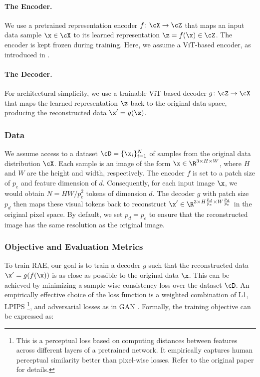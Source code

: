 \documentclass[../../book-main.tex]{subfiles}
\begin{document}
\paragraph{The Encoder.} We use a pretrained representation encoder
$f \colon \cX \to \cZ$ that maps an input data sample $\x \in \cX$ to
its learned representation $\z = f(\x) \in \cZ$. The encoder is kept
frozen during training. Here, we assume a ViT-based encoder, as
introduced in .

\paragraph{The Decoder.} For architectural simplicity, we use a
trainable ViT-based decoder $g \colon \cZ \to \cX$ that maps the
learned representation $\z$ back to the original data space,
producing the reconstructed data $\x' = g(\z)$.

\subsubsection{Data}
We assume access to a dataset $\cD = \{\x_i\}_{i=1}^N$ of samples
from the original data distribution $\cX$. Each sample is an image of
the form $\x \in \R^{3 \times H \times W}$, where $H$ and $W$ are the
height and width, respectively. The encoder $f$ is set to a patch
size of $p_e$ and feature dimension of $d$. Consequently, for each
input image $\x$, we would obtain $N = HW/p_e^2$ tokens of dimension
$d$. The decoder $g$ with patch size $p_d$ then maps these visual
tokens back to reconstruct $\x' \in \R^{3 \times H\frac{p_d}{p_e}
\times W\frac{p_d}{p_e}}$ in the original pixel space. By default, we
set $p_d = p_e$ to ensure that the reconstructed image has the same
resolution as the original image.

\subsubsection{Objective and Evaluation Metrics} To train RAE, our goal
is to train a decoder $g$ such that the reconstructed data $\x' =
g(f(\x))$ is as close as possible to the original data $\x$. This can
be achieved by minimizing a sample-wise consistency loss over the
dataset $\cD$. An empirically effective choice of the loss function
is a weighted combination of L1, LPIPS \cite{zhang2018unreasonable}
\footnote{This is a perceptual loss based on computing distances
between features across different layers of a pretrained network. It
empirically captures human perceptual similarity better than
pixel-wise losses. Refer to the original paper for details.}, and
adversarial losses as in GAN \cite{goodfellow2014generative}.
Formally, the training objective can be expressed as:
\end{document}
